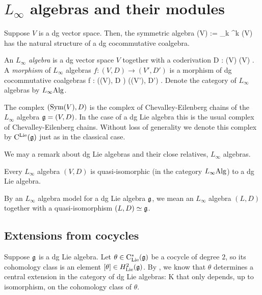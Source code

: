 \appendix

\section{$L_\infty$ algebras and their modules}


Suppose $V$ is a dg vector space. Then, the symmetric algebra 
\ben
\Sym(V) := \prod_{k} \Sym^{k} (V)
\een
has the natural structure of a dg cocommutative coalgebra.

\begin{dfn} An {\em $L_\infty$ algebra} is a dg vector space $V$ together with a coderivation
\ben
D : \Sym(V) \to \Sym(V) .
\een
A {\em morphism} of $L_\infty$ algebras $f : (V,D) \to (V',D')$ is a morphism of dg cocommutative coalgebras
\ben
f : \left(\Sym(V), D \right) \to \left(\Sym(V'), D'\right) .
\een
Denote the category of $L_\infty$ algebras by $L_\infty{\rm Alg}$. 
\end{dfn}

The complex $({\rm Sym}(V), D)$ is the complex of Chevalley-Eilenberg chains of the $L_\infty$ algebra $\mathfrak g = (V,D)$. In the case of a dg Lie algebra this is the usual complex of Chevalley-Eilenberg chains. Without loss of generality we denote this complex by ${\rm C}^{\rm Lie}(\mathfrak g)$ just as in the classical case.

We may a remark about dg Lie algebras and their close relatives, $L_\infty$ algebras. 

\begin{thm} Every $L_\infty$ algebra $(V, D)$ is quasi-isomorphic (in the category $L_\infty{\rm Alg}$) to a dg Lie algebra.
\end{thm}

By an $L_\infty$ algebra model for a dg Lie algebra $\mathfrak g$, we mean an $L_\infty$ algebra $(L, D)$ together with a quasi-isomorphism $(L, D) \simeq \mathfrak g$. 

\subsection{Extensions from cocycles}

Suppose $\mathfrak g$ is a dg Lie algebra. Let $\theta \in {\rm C}_{\rm Lie}^*(\mathfrak g)$ be a cocycle of degree $2$, so its cohomology class is an element $[\theta] \in H^{2}_{\rm Lie}(\mathfrak g)$. By , we know that $\theta$ determines a central extension in the category of dg Lie algebras:
 \to \CC\cdot K \to \Hat{\fg} \to \fg {} 
\een
that only depends, up to isomorphism, on the cohomology class of $\theta$. 

